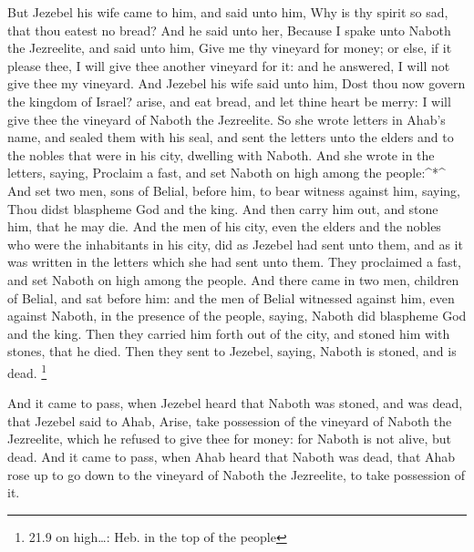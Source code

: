  But Jezebel his wife came to him, and said unto him, Why is
thy spirit so sad, that thou eatest no bread?  And he said
unto her, Because I spake unto Naboth the Jezreelite, and said unto him,
Give me thy vineyard for money; or else, if it please thee, I will give
thee another vineyard for it: and he answered, I will not give thee my
vineyard.  And Jezebel his wife said unto him, Dost thou now
govern the kingdom of Israel? arise, and eat bread, and let thine heart
be merry: I will give thee the vineyard of Naboth the Jezreelite.
 So she wrote letters in Ahab's name, and sealed them with
his seal, and sent the letters unto the elders and to the nobles that
were in his city, dwelling with Naboth.  And she wrote in
the letters, saying, Proclaim a fast, and set Naboth on high among the
people:\^{}*\^{}  And set two men, sons of Belial, before
him, to bear witness against him, saying, Thou didst blaspheme God and
the king. And then carry him out, and stone him, that he may die.
 And the men of his city, even the elders and the nobles
who were the inhabitants in his city, did as Jezebel had sent unto them,
and as it was written in the letters which she had sent unto them.
 They proclaimed a fast, and set Naboth on high among the
people.  And there came in two men, children of Belial, and
sat before him: and the men of Belial witnessed against him, even
against Naboth, in the presence of the people, saying, Naboth did
blaspheme God and the king. Then they carried him forth out of the city,
and stoned him with stones, that he died.  Then they sent
to Jezebel, saying, Naboth is stoned, and is dead. \footnote{21.9 on
  high\ldots: Heb. in the top of the people}

 And it came to pass, when Jezebel heard that Naboth was
stoned, and was dead, that Jezebel said to Ahab, Arise, take possession
of the vineyard of Naboth the Jezreelite, which he refused to give thee
for money: for Naboth is not alive, but dead.  And it came
to pass, when Ahab heard that Naboth was dead, that Ahab rose up to go
down to the vineyard of Naboth the Jezreelite, to take possession of it.

